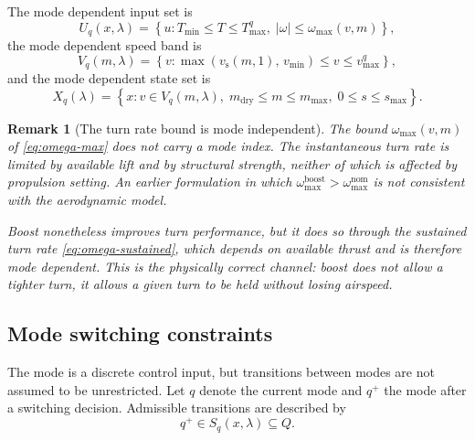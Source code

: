 \documentclass[11pt,a4paper]{article}
\newtheorem{remark}{Remark}
\newcommand{\Xset}{X}
\newcommand{\Uset}{U}
\newcommand{\Vset}{V}
\newcommand{\Qset}{Q}
\newcommand{\Sset}{S}
\newcommand{\vecx}{x}
\newcommand{\vecu}{u}
\newcommand{\veclambda}{\lambda}
\begin{document}
The mode dependent input set is
\begin{equation}
  \Uset_q(\vecx, \veclambda) = \left\{
    \vecu : T_{\min} \le T \le T^{q}_{\max},\;
    |\omega| \le \omega_{\max}(v, m)
  \right\},
\end{equation}
the mode dependent speed band is
\begin{equation}
  \Vset_q(m, \veclambda) = \left\{
    v : \max\!\left(v_{\mathrm{s}}(m,1),\, v_{\min}\right) \le v \le v^{q}_{\max}
  \right\},
\end{equation}
and the mode dependent state set is
\begin{equation}
  \Xset_q(\veclambda) = \left\{
    \vecx : v \in \Vset_q(m, \veclambda),\;
    m_{\mathrm{dry}} \le m \le m_{\max},\;
    0 \le s \le s_{\max}
  \right\}.
\end{equation}

\begin{remark}[The turn rate bound is mode independent]
\label{rem:mode-independent-turn}
The bound $\omega_{\max}(v,m)$ of \cref{eq:omega-max} does not carry a mode
index. The instantaneous turn rate is limited by available lift and by structural
strength, neither of which is affected by propulsion setting. An earlier
formulation in which $\omega^{\mathrm{boost}}_{\max} > \omega^{\mathrm{nom}}_{\max}$
is not consistent with the aerodynamic model.

Boost nonetheless improves turn performance, but it does so through the
\emph{sustained} turn rate \cref{eq:omega-sustained}, which depends on available
thrust and is therefore mode dependent. This is the physically correct channel:
boost does not allow a tighter turn, it allows a given turn to be held without
losing airspeed.
\end{remark}

\subsection{Mode switching constraints}
\label{sec:mode-switching}

The mode is a discrete control input, but transitions between modes are not
assumed to be unrestricted. Let $q$ denote the current mode and $q^{+}$ the mode
after a switching decision. Admissible transitions are described by
\begin{equation}
  q^{+} \in \Sset_q(\vecx, \veclambda) \subseteq \Qset .
  \label{eq:switching-abstract}
\end{equation}
\end{document}
